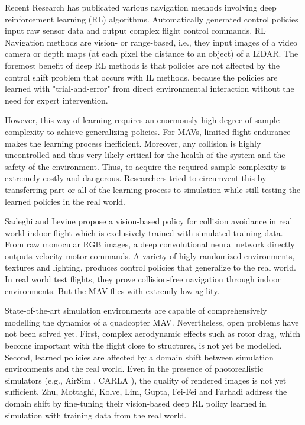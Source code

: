 
Recent Research has publicated various navigation methods involving deep reinforcement learning (RL) algorithms.
Automatically generated control policies input raw sensor data and output complex flight control commands.
RL Navigation methods are vision- or range-based, 
i.e., they input images of a video camera or depth maps (at each pixel the distance to an object) of a LiDAR.
The foremost benefit of deep RL methods is that policies are not affected by the control shift problem that occurs with IL methods,
because the policies are learned with "trial-and-error" \cite{Sadeghi2016} from direct environmental interaction without the need for expert intervention.

However, this way of learning requires an enormously high degree of sample complexity to achieve generalizing policies. \cite{Zhu2017}
For MAVs, limited flight endurance makes the learning process inefficient. \cite{Sadeghi2016}
Moreover, any collision is highly uncontrolled and thus very likely critical for the health of the system and the safety of the environment. \cite{Sadeghi2016}
Thus, to acquire the required sample complexity is extremely costly and dangerous. 
Researchers tried to circumvent this by transferring part or all of the learning process to simulation 
while still testing the learned policies in the real world. 

Sadeghi and Levine \cite{Sadeghi2016} propose a vision-based policy for collision avoidance in real world indoor flight 
which is exclusively trained with simulated training data.
From raw monocular RGB images, a deep convolutional neural network directly outputs velocity motor commands.
A variety of higly randomized environments, textures and lighting, produces control policies that generalize to the real world.
In real world test flights, they prove collision-free navigation through indoor environments. 
But the MAV flies with extremly low agility.

State-of-the-art simulation environments are capable of comprehensively modelling the dynamics of a quadcopter MAV. \cite{Meyer2012}
Nevertheless, open problems have not been solved yet.
First, complex aerodynamic effects such as rotor drag, which become important with the flight close to structures, is not yet be modelled. \cite{Faessler2018}
Second, learned policies are affected by a domain shift between simulation environments and the real world.
Even in the presence of photorealistic simulators (e.g., AirSim \cite{Shah2017}, CARLA \cite{Dosovitskiy2017}),
the quality of rendered images is not yet sufficient.
Zhu, Mottaghi, Kolve, Lim, Gupta, Fei-Fei and Farhadi \cite{Zhu2017} address the domain shift by fine-tuning 
their vision-based deep RL policy learned in simulation with training data from the real world.













